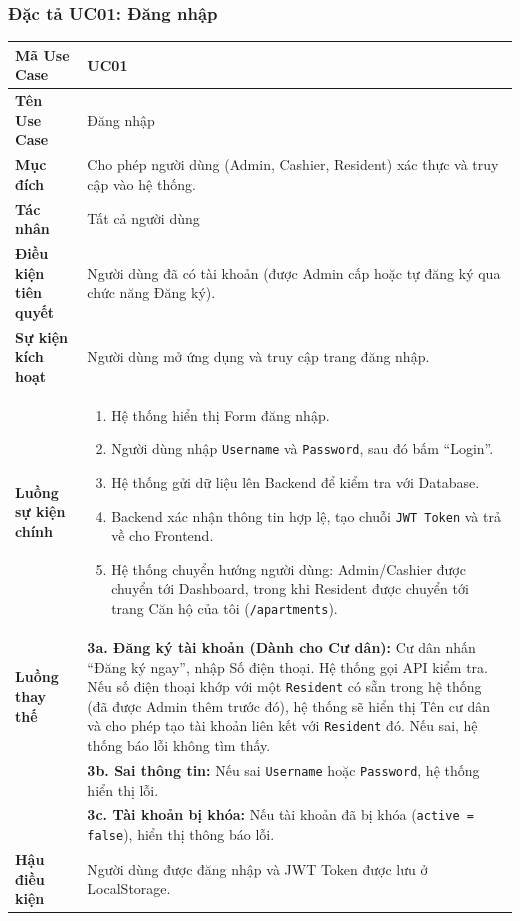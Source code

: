 \documentclass[12pt,a4paper]{article}
\begin{document}
\subsubsection{Đặc tả UC01: Đăng nhập}
\begin{table}[H]
    \centering
    \renewcommand{\arraystretch}{1.2}
    \begin{tabularx}{\textwidth}{|l|X|}
    \hline
    \textbf{Mã Use Case} & \textbf{UC01} \\
    \hline
    \textbf{Tên Use Case} & Đăng nhập \\
    \hline
    \textbf{Mục đích} & Cho phép người dùng (Admin, Cashier, Resident) xác thực và truy cập vào hệ thống. \\
    \hline
    \textbf{Tác nhân} & Tất cả người dùng \\
    \hline
    \textbf{Điều kiện tiên quyết} & Người dùng đã có tài khoản (được Admin cấp hoặc tự đăng ký qua chức năng Đăng ký). \\
    \hline
    \textbf{Sự kiện kích hoạt} & Người dùng mở ứng dụng và truy cập trang đăng nhập. \\
    \hline
    \textbf{Luồng sự kiện chính} &
    \begin{enumerate}
        \item Hệ thống hiển thị Form đăng nhập.
        \item Người dùng nhập \texttt{Username} và \texttt{Password}, sau đó bấm ``Login''.
        \item Hệ thống gửi dữ liệu lên Backend để kiểm tra với Database.
        \item Backend xác nhận thông tin hợp lệ, tạo chuỗi \texttt{JWT Token} và trả về cho Frontend.
        \item Hệ thống chuyển hướng người dùng: Admin/Cashier được chuyển tới Dashboard, trong khi Resident được chuyển tới trang Căn hộ của tôi (\texttt{/apartments}).
    \end{enumerate} \\
    \hline
    \textbf{Luồng thay thế} &
    \textbf{3a. Đăng ký tài khoản (Dành cho Cư dân):} Cư dân nhấn ``Đăng ký ngay'', nhập Số điện thoại. Hệ thống gọi API kiểm tra. Nếu số điện thoại khớp với một \texttt{Resident} có sẵn trong hệ thống (đã được Admin thêm trước đó), hệ thống sẽ hiển thị Tên cư dân và cho phép tạo tài khoản liên kết với \texttt{Resident} đó. Nếu sai, hệ thống báo lỗi không tìm thấy.\\
    & \textbf{3b. Sai thông tin:} Nếu sai \texttt{Username} hoặc \texttt{Password}, hệ thống hiển thị lỗi.\\
    & \textbf{3c. Tài khoản bị khóa:} Nếu tài khoản đã bị khóa (\texttt{active = false}), hiển thị thông báo lỗi. \\
    \hline
    \textbf{Hậu điều kiện} & Người dùng được đăng nhập và JWT Token được lưu ở LocalStorage. \\
    \hline
    \end{tabularx}
\end{table}
\end{document}
